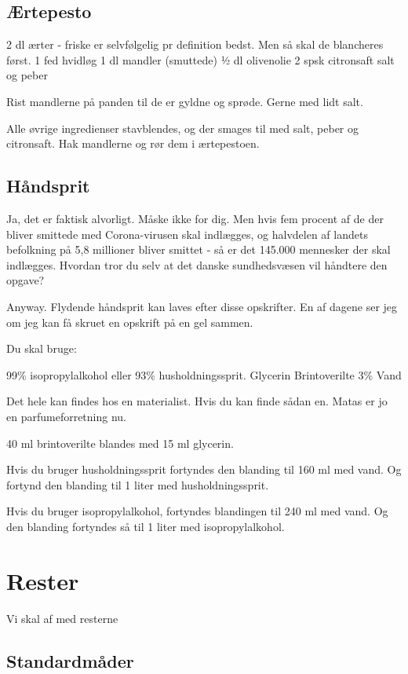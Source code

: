 \documentclass[
]{book}
\begin{document}
\section{Ærtepesto}\label{uxe6rtepesto}

2 dl ærter - friske er selvfølgelig pr definition bedst. Men så skal de blancheres først.
1 fed hvidløg
1 dl mandler (smuttede)
½ dl olivenolie
2 spsk citronsaft
salt og peber

Rist mandlerne på panden til de er gyldne og sprøde. Gerne med lidt salt.

Alle øvrige ingredienser stavblendes, og der smages til med salt, peber og citronsaft. Hak mandlerne og rør dem i ærtepestoen.

\section{Håndsprit}\label{huxe5ndsprit}

Ja, det er faktisk alvorligt. Måske ikke for dig. Men hvis fem procent af de der bliver smittede med Corona-virusen skal indlægges, og halvdelen af landets befolkning på 5,8 millioner bliver smittet - så er det 145.000 mennesker der skal indlægges. Hvordan tror du selv at det danske sundhedsvæsen vil håndtere den opgave?

Anyway. Flydende håndsprit kan laves efter disse opskrifter. En af dagene ser jeg om jeg kan få skruet en opskrift på en gel sammen.

Du skal bruge:

99\% isopropylalkohol eller 93\% husholdningssprit.
Glycerin
Brintoverilte 3\%
Vand

Det hele kan findes hos en materialist. Hvis du kan finde sådan en. Matas er jo en parfumeforretning nu.

40 ml brintoverilte blandes med 15 ml glycerin.

Hvis du bruger husholdningssprit fortyndes den blanding til 160 ml med vand. Og fortynd den blanding til 1 liter med husholdningssprit.

Hvis du bruger isopropylalkohol, fortyndes blandingen til 240 ml med vand. Og den blanding fortyndes så til 1 liter med isopropylalkohol.

\chapter{Rester}\label{rester}

Vi skal af med resterne

\section{Standardmåder}\label{standardmuxe5der}
\end{document}
